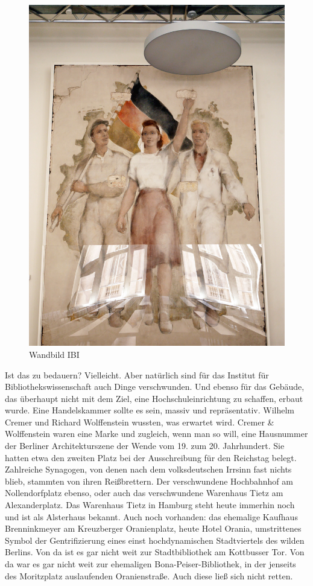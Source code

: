 \documentclass[a4paper,
fontsize=11pt,
oneside,
numbers=noperiodatend,
parskip=half-,
bibliography=totoc,
final
]{scrartcl}
\begin{document}
\begin{figure}
\centering
\includegraphics{img/wandbild-ibi.jpg}
\caption{Wandbild IBI}
\end{figure}

Ist das zu bedauern? Vielleicht. Aber natürlich sind für das Institut
für Bibliothekswissenschaft auch Dinge verschwunden. Und ebenso für das
Gebäude, das überhaupt nicht mit dem Ziel, eine Hochschuleinrichtung zu
schaffen, erbaut wurde. Eine Handelskammer sollte es sein, massiv und
repräsentativ. Wilhelm Cremer und Richard Wolffenstein wussten, was
erwartet wird. Cremer \& Wolffenstein waren eine Marke und zugleich,
wenn man so will, eine Hausnummer der Berliner Architekturszene der
Wende vom 19. zum 20. Jahrhundert. Sie hatten etwa den zweiten Platz bei
der Ausschreibung für den Reichstag belegt. Zahlreiche Synagogen, von
denen nach dem volksdeutschen Irrsinn fast nichts blieb, stammten von
ihren Reißbrettern. Der verschwundene Hochbahnhof am Nollendorfplatz
ebenso, oder auch das verschwundene Warenhaus Tietz am Alexanderplatz.
Das Warenhaus Tietz in Hamburg steht heute immerhin noch und ist als
Alsterhaus bekannt. Auch noch vorhanden: das ehemalige Kaufhaus
Brenninkmeyer am Kreuzberger Oranienplatz, heute Hotel Orania,
umstrittenes Symbol der Gentrifizierung eines einst hochdynamischen
Stadtviertels des wilden Berlins. Von da ist es gar nicht weit zur
Stadtbibliothek am Kottbusser Tor. Von da war es gar nicht weit zur
ehemaligen Bona-Peiser-Bibliothek, in der jenseits des Moritzplatz
auslaufenden Oranienstraße. Auch diese ließ sich nicht retten.
\end{document}
